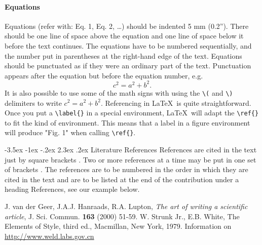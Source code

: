 \documentclass[a4paper, 12pt,oneside]{article}
\makeatletter
\renewcommand{\section}{\@startsection {section}{1}{\z@}%
             {-3.5ex \@plus -1ex \@minus -.2ex}%
             {2.3ex \@plus.2ex}%
             {\normalfont\normalsize\bfseries}}
\makeatother
\begin{document}
\paragraph{Equations}%
Equations (refer with: Eq. 1, Eq. 2, \ldots) should be indented 5 mm (0.2''). %
There should be one line of space above the equation and one line of space below it before the text continues. %
The equations have to be numbered sequentially, and the number put in parentheses at the right-hand edge of the text. %
Equations should be punctuated as if they were an ordinary part of the text. %
Punctuation appears after the equation but before the equation number, e.g.
%
\begin{equation}
c^2 = a^2 + b^2.
\label{eqn:1}
\end{equation}
It is also possible to use some of the math signs with using the \verb!\(! and  \verb!\)! delimiters to write \(c^2 = a^2 + b^2\).
\newline%
%
Referencing in \LaTeX\ is quite straightforward. %
Once you put a \verb!\label{}! in a special environment, \LaTeX\ will adapt the \verb!\ref{}! to fit the kind of environment. %
This means that a label in a figure environment will produce "Fig. 1" when calling \verb!\ref{}!.

%
\section{Literature References}
References are cited in the text just by square brackets \cite{ref1}. %
Two or more references at a time may be put in one set of brackets \cite{ref1, ref2}. %
The references are to be numbered in the order in which they are cited in the text and are to be listed at the end of the contribution under a heading References, see our example below. 

\begin{thebibliography}{99}
J. van der Geer, J.A.J. Hanraads, R.A. Lupton, \textit{The art of writing a scientific article}, J. Sci. Commun. \textbf{163} (2000) 51-59.
W. Strunk Jr., E.B. White, The Elements of Style, third ed., Macmillan, New York, 1979.
Information on \url{http://www.weld.labs.gov.cn}
\end{thebibliography}
\end{document}
